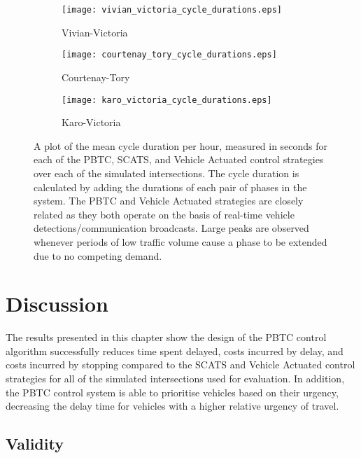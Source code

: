 \begin{figure}
\centering
\begin{subfigure}{.5\textwidth}	
  \centering
  \texttt{[image: vivian\_victoria\_cycle\_durations.eps]}
  \caption{Vivian-Victoria}
  \label{cycle_durations:sub1}
\end{subfigure}%
\begin{subfigure}{.5\textwidth}
  \centering
  \texttt{[image: courtenay\_tory\_cycle\_durations.eps]}
  \caption{Courtenay-Tory}
  \label{cycle_durations:sub2}
\end{subfigure}

\vspace{1cm}

\begin{subfigure}{.5\textwidth}
  \centering
  \texttt{[image: karo\_victoria\_cycle\_durations.eps]}
  \caption{Karo-Victoria}
  \label{cycle_durations:sub3}
\end{subfigure}%
\caption[Results of measuring the mean cycle duration per hour for each control strategy and intersection.]{ A plot of the mean cycle duration per hour, measured in seconds for each of the PBTC, SCATS, and Vehicle Actuated control strategies over each of the simulated intersections. The cycle duration is calculated by adding the durations of each pair of phases in the system. The PBTC and Vehicle Actuated strategies are closely related as they both operate on the basis of real-time vehicle detections/communication broadcasts. Large peaks are observed whenever periods of low traffic volume cause a phase to be extended due to no competing demand.  }
\label{eval:cycle_durations}
\end{figure}

\section{Discussion}

The results presented in this chapter show the design of the PBTC control algorithm successfully reduces time spent delayed, costs incurred by delay, and costs incurred by stopping compared to the SCATS and Vehicle Actuated control strategies for all of the simulated intersections used for evaluation. In addition, the PBTC control system is able to prioritise vehicles based on their urgency, decreasing the delay time for vehicles with a higher relative urgency of travel.

\subsection{Validity}

